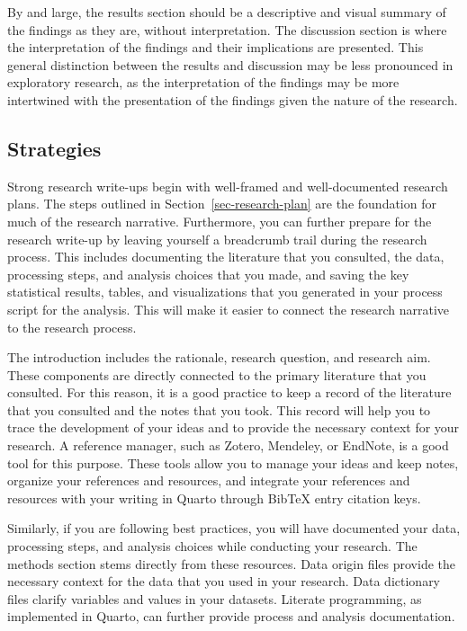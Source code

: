 \documentclass[
  letterpaper,
  krantz1]{latex/krantz-mod}
\theoremstyle{definition}
\theoremstyle{definition}
\theoremstyle{remark}
\begin{document}
By and large, the results section should be a descriptive and visual
summary of the findings as they are, without
interpretation. The discussion section is
where the interpretation of the findings and their implications are
presented. This general distinction
between the results and discussion may be less pronounced in exploratory
research, as the interpretation of the findings may be more intertwined
with the presentation of the findings given the nature of the research.

\subsection{Strategies}\label{sec-contribute-public-strategies}

Strong research write-ups begin with well-framed and well-documented
research plans. The steps outlined in
Section~\ref{sec-research-plan} are the foundation for much of the
research narrative. Furthermore, you can further prepare for the
research write-up by leaving yourself a breadcrumb trail during the
research process. This includes documenting the literature that you
consulted, the data, processing steps, and analysis choices that you
made, and saving the key statistical results, tables, and visualizations
that you generated in your process script for the analysis. This will
make it easier to connect the research narrative to the research
process.

The introduction includes the rationale,
research question, and research
aim. These components are directly connected to the
primary literature that you consulted. For this reason, it is a good
practice to keep a record of the literature that you consulted and the
notes that you took. This record will help you to trace the development
of your ideas and to provide the necessary context for your research. A
reference manager, such as Zotero, Mendeley, or EndNote, is a good tool
for this purpose. These tools allow you to manage your ideas and keep
notes, organize your references and resources, and integrate your
references and resources with your writing in Quarto through BibTeX
entry citation keys.

Similarly, if you are following best practices, you will have documented
your data, processing steps, and analysis
choices while conducting your research. The methods section stems
directly from these resources. Data origin files
provide the necessary context for the data that you used in your
research. Data dictionary files clarify variables
and values in your datasets. Literate
programming, as implemented in Quarto, can
further provide process and analysis documentation.
\end{document}
